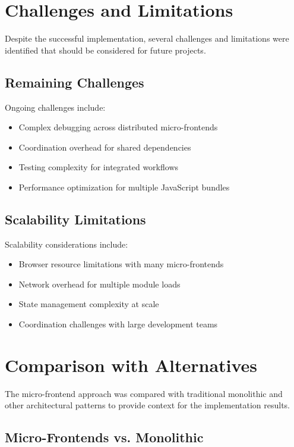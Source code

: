 \documentclass[12pt,a4paper]{report}
\begin{document}
\section{Challenges and Limitations}

Despite the successful implementation, several challenges and limitations were identified that should be considered for future projects.

\subsection{Remaining Challenges}

Ongoing challenges include:
\begin{itemize}
    \item Complex debugging across distributed micro-frontends
    \item Coordination overhead for shared dependencies
    \item Testing complexity for integrated workflows
    \item Performance optimization for multiple JavaScript bundles
\end{itemize}

\subsection{Scalability Limitations}

Scalability considerations include:
\begin{itemize}
    \item Browser resource limitations with many micro-frontends
    \item Network overhead for multiple module loads
    \item State management complexity at scale
    \item Coordination challenges with large development teams
\end{itemize}

\section{Comparison with Alternatives}

The micro-frontend approach was compared with traditional monolithic and other architectural patterns to provide context for the implementation results.

\subsection{Micro-Frontends vs. Monolithic}
\end{document}
